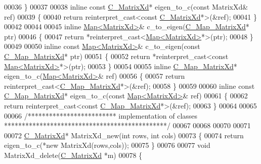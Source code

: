\begin{DoxyCode}
00036 \}
00037 
00038 \textcolor{keyword}{inline} \textcolor{keyword}{const} \hyperlink{struct_c___matrix_xd}{C\_MatrixXd}* eigen\_to\_c(\textcolor{keyword}{const} MatrixXd& ref)
00039 \{
00040   \textcolor{keywordflow}{return} \textcolor{keyword}{reinterpret\_cast<}\textcolor{keyword}{const }\hyperlink{struct_c___matrix_xd}{C\_MatrixXd}*\textcolor{keyword}{>}(&ref);
00041 \}
00042 
00044 
00045 \textcolor{keyword}{inline} \hyperlink{group___core___module_class_eigen_1_1_map}{Map<MatrixXd>}& c\_to\_eigen(\hyperlink{struct_c___map___matrix_xd}{C\_Map\_MatrixXd}* ptr)
00046 \{
00047   \textcolor{keywordflow}{return} *\textcolor{keyword}{reinterpret\_cast<}\hyperlink{group___core___module_class_eigen_1_1_map}{Map<MatrixXd>}*\textcolor{keyword}{>}(ptr);
00048 \}
00049 
00050 \textcolor{keyword}{inline} \textcolor{keyword}{const} \hyperlink{group___core___module_class_eigen_1_1_map}{Map<MatrixXd>}& c\_to\_eigen(\textcolor{keyword}{const} \hyperlink{struct_c___map___matrix_xd}{C\_Map\_MatrixXd}* ptr)
00051 \{
00052   \textcolor{keywordflow}{return} *\textcolor{keyword}{reinterpret\_cast<}\textcolor{keyword}{const }\hyperlink{group___core___module_class_eigen_1_1_map}{Map<MatrixXd>}*\textcolor{keyword}{>}(ptr);
00053 \}
00054 
00055 \textcolor{keyword}{inline} \hyperlink{struct_c___map___matrix_xd}{C\_Map\_MatrixXd}* eigen\_to\_c(\hyperlink{group___core___module_class_eigen_1_1_map}{Map<MatrixXd>}& ref)
00056 \{
00057   \textcolor{keywordflow}{return} \textcolor{keyword}{reinterpret\_cast<}\hyperlink{struct_c___map___matrix_xd}{C\_Map\_MatrixXd}*\textcolor{keyword}{>}(&ref);
00058 \}
00059 
00060 \textcolor{keyword}{inline} \textcolor{keyword}{const} \hyperlink{struct_c___map___matrix_xd}{C\_Map\_MatrixXd}* eigen\_to\_c(\textcolor{keyword}{const} \hyperlink{group___core___module_class_eigen_1_1_map}{Map<MatrixXd>}& ref)
00061 \{
00062   \textcolor{keywordflow}{return} \textcolor{keyword}{reinterpret\_cast<}\textcolor{keyword}{const }\hyperlink{struct_c___map___matrix_xd}{C\_Map\_MatrixXd}*\textcolor{keyword}{>}(&ref);
00063 \}
00064 
00065 
00066 \textcolor{comment}{/************************* implementation of classes **********************************************/}
00067 
00068 
00070 
00071 
00072 \hyperlink{struct_c___matrix_xd}{C\_MatrixXd}* MatrixXd\_new(\textcolor{keywordtype}{int} rows, \textcolor{keywordtype}{int} cols)
00073 \{
00074   \textcolor{keywordflow}{return} eigen\_to\_c(*\textcolor{keyword}{new} MatrixXd(rows,cols));
00075 \}
00076 
00077 \textcolor{keywordtype}{void} MatrixXd\_delete(\hyperlink{struct_c___matrix_xd}{C\_MatrixXd} *m)
00078 \{

\end{DoxyCode}

